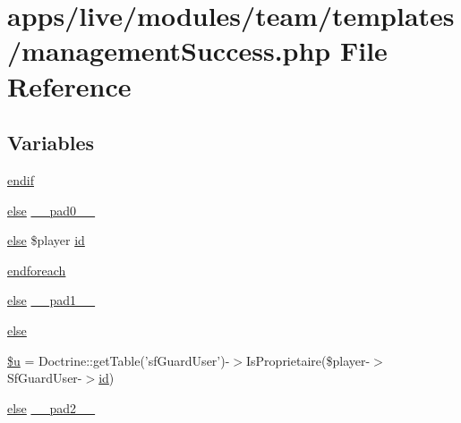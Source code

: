 \hypertarget{live_2modules_2team_2templates_2management_success_8php}{\section{apps/live/modules/team/templates/management\-Success.php File Reference}
\label{live_2modules_2team_2templates_2management_success_8php}
}
\subsection*{Variables}
\begin{DoxyCompactItemize}
\item 
\hyperlink{live_2modules_2team_2templates_2management_success_8php_a82cd33ca97ff99f2fcc5e9c81d65251b}{endif}
\item 
\hyperlink{live_2modules_2team_2templates_2management_success_8php_a0544c3fe466e421738dae463968b70ba}{else} \hyperlink{live_2modules_2team_2templates_2management_success_8php_a8e01dcc96c43199448ee66f7c2ae8ea6}{\-\_\-\-\_\-pad0\-\_\-\-\_\-}
\item 
\hyperlink{live_2modules_2team_2templates_2management_success_8php_a0544c3fe466e421738dae463968b70ba}{else} \$player \hyperlink{live_2modules_2team_2templates_2management_success_8php_ad9851c94d15b310fef9eaded57c23ddf}{id}
\item 
\hyperlink{live_2modules_2team_2templates_2management_success_8php_a672d9707ef91db026c210f98cc601123}{endforeach}
\item 
\hyperlink{live_2modules_2team_2templates_2management_success_8php_a0544c3fe466e421738dae463968b70ba}{else} \hyperlink{live_2modules_2team_2templates_2management_success_8php_ae8b4bb1441c6ab4dcb28a37bc46c8ead}{\-\_\-\-\_\-pad1\-\_\-\-\_\-}
\item 
\hyperlink{live_2modules_2team_2templates_2management_success_8php_a0544c3fe466e421738dae463968b70ba}{else}
\item 
\hyperlink{live_2modules_2team_2templates_2management_success_8php_ad9bcfd597eba04db946451e8368a1f05}{\$u} = Doctrine\-::get\-Table('sf\-Guard\-User')-\/$>$Is\-Proprietaire(\$player-\/$>$Sf\-Guard\-User-\/$>$\hyperlink{live_2modules_2team_2templates_2management_success_8php_ad9851c94d15b310fef9eaded57c23ddf}{id})
\item 
\hyperlink{live_2modules_2team_2templates_2management_success_8php_a0544c3fe466e421738dae463968b70ba}{else} \hyperlink{live_2modules_2team_2templates_2management_success_8php_aed2d37b4e8da3f52103ae96ce9d26d82}{\-\_\-\-\_\-pad2\-\_\-\-\_\-}
\end{DoxyCompactItemize}


